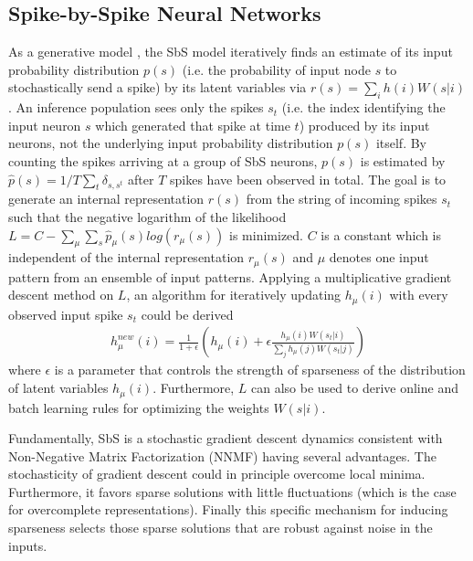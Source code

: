 \subsection{Spike-by-Spike Neural Networks}
\label{sec:sbs}
  
  As a generative model \cite{ernst2007efficient}, the SbS model iteratively finds an estimate of its input probability distribution $p(s)$ (i.e. the probability of input node $s$ to stochastically send a spike) by its latent variables via $r(s) = \sum_i h(i) W(s|i)$. An inference population sees only the spikes $s_t$ (i.e. the index identifying the input neuron $s$ which generated that spike at time $t$) produced by its input neurons, not the underlying input probability distribution $p(s)$ itself. By counting the spikes arriving at a group of SbS neurons, $p(s)$ is estimated by $\hat{p}(s) = 1/T \sum_t \delta_{s,s^t}$ after $T$ spikes have been observed in total. The goal is to generate an internal representation $r(s)$ from the string of incoming spikes $s_t$ such that the negative logarithm of the likelihood $L = C - \sum_\mu \sum_s \hat{p}_\mu(s) log\left( r_\mu(s) \right)$ is minimized. $C$ is a constant which is independent of the internal representation $r_\mu(s)$ and $\mu$ denotes one input pattern from an ensemble of input patterns. Applying a multiplicative gradient descent method on $L$, an algorithm for iteratively updating $h_\mu(i)$ with every observed input spike $s_t$ could be derived
  \begin{eqnarray} \label{eq:sbs_update}
  h_\mu^{new}(i) = \frac{1}{1+\epsilon} \left(h_\mu(i) + \epsilon \frac{h_\mu(i) W(s_t|i) }{\sum_j h_\mu(j) W(s_t|j)} \right) 
  \end{eqnarray}
  where $\epsilon$ is a parameter that controls the strength of sparseness of the distribution of latent variables $h_\mu(i)$. Furthermore, $L$ can also be used to derive online and batch learning rules for optimizing the weights $W(s|i)$. 


Fundamentally, SbS is a stochastic gradient descent dynamics
consistent with Non-Negative Matrix Factorization (NNMF) having several advantages. The stochasticity of gradient descent could
in principle overcome local minima.  Furthermore, it favors sparse
solutions with little fluctuations (which is the case for overcomplete
representations). Finally this specific mechanism for inducing
sparseness selects those sparse solutions that are robust against
noise in the inputs.

